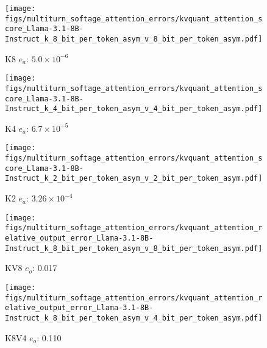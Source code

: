 %
%
\begin{figure*}
    \centering
    \begin{subfigure}{0.25\columnwidth}
    \texttt{[image: figs/multiturn\_softage\_attention\_errors/kvquant\_attention\_score\_Llama-3.1-8B-Instruct\_k\_8\_bit\_per\_token\_asym\_v\_8\_bit\_per\_token\_asym.pdf]}
    \caption{K8 $e_a$: $5.0\times 10^{-6}$}
    \label{fig:kvcache_simulated_quant_attention_score_error_layer_wise_k8_per_token_asym_Llama3.1-8B-Instruct_multirurn_softage}
    \end{subfigure}
    \begin{subfigure}{0.25\columnwidth}
    \texttt{[image: figs/multiturn\_softage\_attention\_errors/kvquant\_attention\_score\_Llama-3.1-8B-Instruct\_k\_4\_bit\_per\_token\_asym\_v\_4\_bit\_per\_token\_asym.pdf]}
    \caption{K4 $e_a$: $6.7\times 10^{-5}$}
    \label{fig:kvcache_simulated_quant_attention_score_error_layer_wise_k4_per_token_asym_Llama3.1-8B-Instruct_multirurn_softage}
    \end{subfigure}
    \begin{subfigure}{0.25\columnwidth}
    \texttt{[image: figs/multiturn\_softage\_attention\_errors/kvquant\_attention\_score\_Llama-3.1-8B-Instruct\_k\_2\_bit\_per\_token\_asym\_v\_2\_bit\_per\_token\_asym.pdf]}
    \caption{K2 $e_a$: $3.26\times 10^{-4}$}
    \label{fig:kvcache_simulated_quant_attention_score_error_layer_wise_k2_per_token_asym_Llama3.1-8B-Instruct_multirurn_softage}
    \end{subfigure}
    \begin{subfigure}{0.25\columnwidth}
    \texttt{[image: figs/multiturn\_softage\_attention\_errors/kvquant\_attention\_relative\_output\_error\_Llama-3.1-8B-Instruct\_k\_8\_bit\_per\_token\_asym\_v\_8\_bit\_per\_token\_asym.pdf]}
    \caption{KV8 $e_o$: 0.017}
    \label{fig:kvcache_simulated_quant_error_layer_wise_k8v8_per_token_asym_Llama3.1-8B-Instruct_multirurn_softage}
    \end{subfigure}
    \begin{subfigure}{0.25\columnwidth}
    \texttt{[image: figs/multiturn\_softage\_attention\_errors/kvquant\_attention\_relative\_output\_error\_Llama-3.1-8B-Instruct\_k\_8\_bit\_per\_token\_asym\_v\_4\_bit\_per\_token\_asym.pdf]}
    \caption{K8V4 $e_o$: 0.110}
    \label{fig:kvcache_simulated_quant_error_layer_wise_k8v4_per_token_asym_Llama3.1-8B-Instruct_multirurn_softage}
    \end{subfigure}

\end{figure*}
